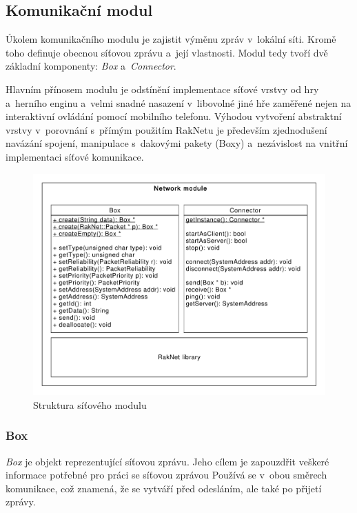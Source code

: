 \documentclass[thesis=B,czech,hidelinks]{FITthesis}[2012/06/26] %
\begin{document}
\subsection{Komunikační modul}

Úkolem komunikačního modulu je zajistit výměnu zpráv v~lokální síti. Kromě toho definuje obecnou síťovou zprávu a~její vlastnosti. Modul tedy tvoří dvě základní komponenty: \textit{Box} a~\textit{Connector}. 

Hlavním přínosem modulu je odstínění implementace síťové vrstvy od hry a~herního enginu a~velmi snadné nasazení v~libovolné jiné hře zaměřené nejen na interaktivní ovládání pomocí mobilního telefonu. Výhodou vytvoření abstraktní vrstvy v~porovnání s~přímým použitím RakNetu je především zjednodušení navázání spojení, manipulace s~dakovými pakety (Boxy) a~nezávislost na vnitřní implementaci síťové komunikace.

\begin{figure}[h]
\includegraphics[width=\textwidth]{box_connector}
\caption{Struktura síťového modulu}
\end{figure}

\subsubsection{Box}

\textit{Box} je objekt reprezentující síťovou zprávu. Jeho cílem je zapouzdřit veškeré informace potřebné pro práci se síťovou zprávou Používá se v~obou směrech komunikace, což znamená, že se vytváří před odesláním, ale také po přijetí zprávy.
\end{document}
